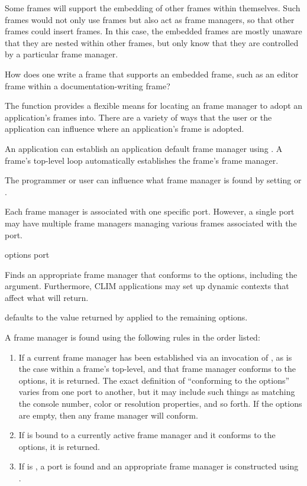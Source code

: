 Some frames will support the embedding of other frames within themselves.  Such
frames would not only use frames but also act as frame managers, so that other
frames could insert frames.  In this case, the embedded frames are mostly
unaware that they are nested within other frames, but only know that they are
controlled by a particular frame manager.

 {How does one write a frame that supports an embedded frame, such
as an editor frame within a documentation-writing frame?}

The  function provides a flexible means for locating an
frame manager to adopt an application's frames into.  There are a variety of
ways that the user or the application can influence where an application's frame
is adopted.

An application can establish an application default frame manager using
.  A frame's top-level loop automatically establishes the
frame's frame manager.

The programmer or user can influence what frame manager is found by setting
 or .

Each frame manager is associated with one specific port.  However, a single port
may have multiple frame managers managing various frames associated with the
port.


 {\rest options \key port \allow}

Finds an appropriate frame manager that conforms to the options, including the
 argument.  Furthermore, CLIM applications may set up dynamic contexts
that affect what  will return.

 defaults to the value returned by  applied to the remaining options.

A frame manager is found using the following rules in the order listed:

\begin{enumerate}
\item If a current frame manager has been established via an invocation of
, as is the case within a frame's top-level, and that
frame manager conforms to the options, it is returned.  The exact definition of
``conforming to the options'' varies from one port to another, but it may
include such things as matching the console number, color or resolution
properties, and so forth.  If the options are empty, then any frame manager will
conform.

\item If  is bound to a currently active frame
manager and it conforms to the options, it is returned.

\item If  is , a port is found and an appropriate
frame manager is constructed using .
\end{enumerate}


